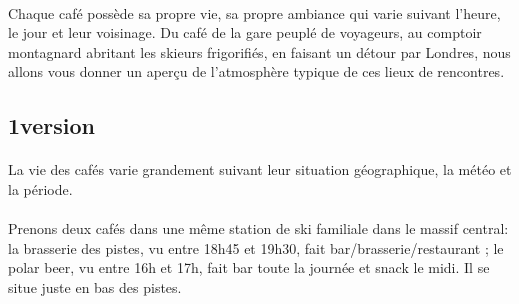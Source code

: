 \paragraph{}
Chaque café possède sa propre vie, sa propre ambiance qui varie suivant l’heure, le jour et leur voisinage. Du café de la gare peuplé de voyageurs, au comptoir montagnard abritant les skieurs frigorifiés, en faisant un détour par Londres, nous allons vous donner un aperçu de l’atmosphère typique de ces lieux de rencontres.


\subsection{1\ier version}
\paragraph{}
La vie des cafés varie grandement suivant leur situation géographique, la météo et la période.

\paragraph{}
Prenons deux cafés dans une même station de ski familiale dans le massif central: la brasserie des pistes, vu entre 18h45 et 19h30, fait bar/brasserie/restaurant ; le polar beer, vu entre 16h et 17h, fait bar toute la journée et snack le midi. Il se situe juste en bas des pistes.


